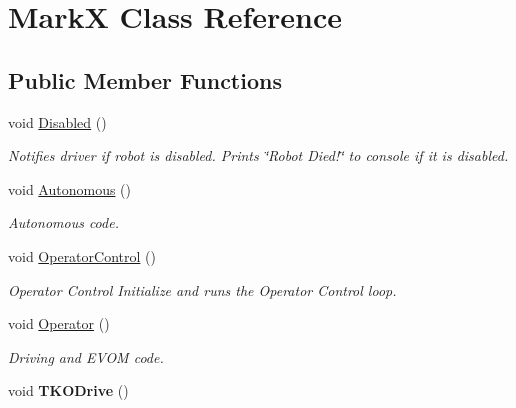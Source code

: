 \hypertarget{classMarkX}{\section{\-Mark\-X \-Class \-Reference}
\label{classMarkX}
}
\subsection*{\-Public \-Member \-Functions}
\begin{DoxyCompactItemize}
\item 
\hypertarget{classMarkX_a41d9adbc4fa71a9ee08ce212564bbbf3}{void \hyperlink{classMarkX_a41d9adbc4fa71a9ee08ce212564bbbf3}{\-Disabled} ()}\label{classMarkX_a41d9adbc4fa71a9ee08ce212564bbbf3}

\begin{DoxyCompactList}\small\item\em \-Notifies driver if robot is disabled. \-Prints \char`\"{}\-Robot Died!\char`\"{} to console if it is disabled. \end{DoxyCompactList}\item 
\hypertarget{classMarkX_a2eb4b8bbbd0c77f13ec8e1e146697202}{void \hyperlink{classMarkX_a2eb4b8bbbd0c77f13ec8e1e146697202}{\-Autonomous} ()}\label{classMarkX_a2eb4b8bbbd0c77f13ec8e1e146697202}

\begin{DoxyCompactList}\small\item\em \-Autonomous code. \end{DoxyCompactList}\item 
void \hyperlink{classMarkX_a805d243d52b14400654fb7729ada64ee}{\-Operator\-Control} ()
\begin{DoxyCompactList}\small\item\em \-Operator \-Control \-Initialize and runs the \-Operator \-Control loop. \end{DoxyCompactList}\item 
\hypertarget{classMarkX_a45e7bc7a9bad1fa9bdc46b3382b6740e}{void \hyperlink{classMarkX_a45e7bc7a9bad1fa9bdc46b3382b6740e}{\-Operator} ()}\label{classMarkX_a45e7bc7a9bad1fa9bdc46b3382b6740e}

\begin{DoxyCompactList}\small\item\em \-Driving and \-E\-V\-O\-M code. \end{DoxyCompactList}\item 
\hypertarget{classMarkX_a9aacece1681d7b08a1832cb7e3b7691a}{void {\bfseries \-T\-K\-O\-Drive} ()}\label{classMarkX_a9aacece1681d7b08a1832cb7e3b7691a}


\end{DoxyCompactItemize}
